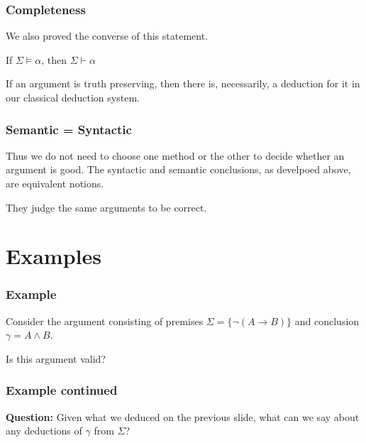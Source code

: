 \documentclass{beamer}
\begin{document}
\begin{frame}
	\frametitle{Completeness}
	
	We also proved the converse of this statement. 
	
	\vspace{0.5cm}
	
	 If $\Sigma \vDash \alpha $, then $\Sigma \vdash \alpha $
	
	\vspace{0.5cm}
	
	If an argument is truth preserving, then there is, necessarily, a deduction for it in our classical deduction system.
\end{frame}

\begin{frame}
	\frametitle{Semantic = Syntactic}
	
	Thus we do not need to choose one method or the other to decide whether an argument is good. The syntactic and semantic conclusions, as develpoed above, are equivalent notions. 
	
	\vspace{0.5cm}
	
	They judge the same arguments to be correct.  
\end{frame}

\section{Examples}

\begin{frame}
	\frametitle{Example}
	
	Consider the argument consisting of premises $\Sigma = \{\lnot (A \rightarrow B)\}$ and conclusion $\gamma = A \land B$. 
	
	\vspace{0.5cm} 
	
	 Is this argument valid? 
	
	\vspace{7cm}
	
\end{frame}

\begin{frame}
	\frametitle{Example continued}
	
	{\bf Question:} Given what we deduced on the previous slide, what can we say about any deductions of $\gamma$ from $\Sigma$?
	
	\vspace{7cm}
	
\end{frame}
\end{document}
